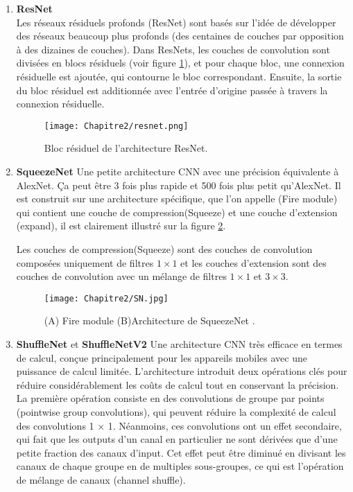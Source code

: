 \begin{enumerate}
\item \textbf{ResNet}\cite{resnet}\\
Les réseaux résiduels profonds (ResNet) sont basés sur l'idée de développer des réseaux beaucoup plus profonds (des centaines de couches par opposition à des dizaines de couches). Dans ResNets, les couches de convolution sont divisées en blocs résiduels (voir figure \ref{resnet}), et pour chaque bloc, une connexion résiduelle est ajoutée, qui contourne le bloc correspondant. Ensuite, la sortie du bloc résiduel est additionnée avec l'entrée d'origine passée à travers la connexion résiduelle. 
\begin{figure}[H]
\centering
\texttt{[image: Chapitre2/resnet.png]}
\caption{ Bloc résiduel de l'architecture ResNet. \cite{resnet}}
\label{resnet}
\end{figure} 

\item \textbf{SqueezeNet} \cite{SqueezeNet2016}
Une petite architecture CNN avec une précision équivalente à AlexNet. Ça peut être  3 fois plus rapide et 500 fois plus petit qu'AlexNet.
Il est construit sur une architecture spécifique, que l'on appelle (Fire module) qui contient une couche de compression(Squeeze) et une couche d'extension (expand), il est clairement illustré sur la figure \ref{SN}.

Les couches de compression(Squeeze) sont des couches de convolution composées uniquement de filtres $1\times 1$ et les couches d'extension sont des couches de convolution avec un mélange de filtres $1 \times 1$ et $3 \times 3$.
\begin{figure}[H]
\centering
  \texttt{[image: Chapitre2/SN.jpg]} 
   \caption{(A) Fire module (B)Architecture de SqueezeNet \cite{SqueezeNet2016}.}
   \label{SN}
 \end{figure}

\item \textbf{ShuffleNet} \cite{shufflenet2018} et \textbf{ShuffleNetV2}\cite{shufflenetV2}
Une architecture CNN très efficace en termes de calcul, conçue principalement pour les appareils mobiles avec une puissance de calcul limitée. L'architecture introduit deux opérations clés pour réduire considérablement les coûts de calcul tout en conservant la précision. La première opération consiste en des convolutions de groupe par points (pointwise group convolutions), qui peuvent réduire la complexité de calcul des convolutions 1 × 1. Néanmoins, ces convolutions ont un effet secondaire, qui fait que les outputs d'un canal en particulier ne sont dérivées que d'une petite fraction des canaux d'input. Cet effet peut être diminué en divisant les canaux de chaque groupe en de multiples sous-groupes, ce qui est l'opération de mélange de canaux (channel shuffle).


\end{enumerate}
